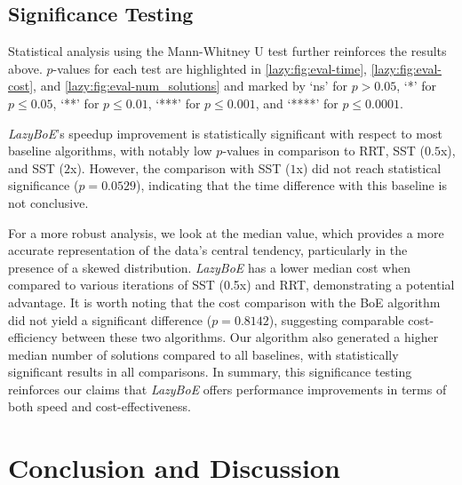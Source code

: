 \subsection{Significance Testing}

Statistical analysis using the Mann-Whitney U test further reinforces the results above.
$p$-values for each test are highlighted in \cref{lazy:fig:eval-time}, \cref{lazy:fig:eval-cost}, and \cref{lazy:fig:eval-num_solutions} and marked by `ns' for $p > 0.05$, `*' for $p \leq 0.05$, `**' for $p \leq 0.01$, `***' for $p \leq 0.001$, and `****' for $p \leq 0.0001$.

\textsl{LazyBoE}'s speedup improvement is statistically significant with respect to most baseline algorithms, with notably low $p$-values in comparison to RRT, SST ($0.5$x), and SST ($2$x). However, the comparison with SST ($1$x) did not reach statistical significance ($p = 0.0529$), indicating that the time difference with this baseline is not conclusive.

For a more robust analysis, we look at the median value, which provides a more accurate representation of the data's central tendency, particularly in the presence of a skewed distribution.
\textsl{LazyBoE} has a lower median cost when compared to various iterations of SST (0.5x) and RRT, demonstrating a potential advantage. It is worth noting that the cost comparison with the BoE algorithm did not yield a significant difference ($p = 0.8142$), suggesting comparable cost-efficiency between these two algorithms.
Our algorithm also generated a higher median number of solutions compared to all baselines, with statistically significant results in all comparisons.
In summary, this significance testing reinforces our claims that \textsl{LazyBoE} offers performance improvements in terms of both speed and cost-effectiveness.

\section{Conclusion and Discussion}
\label{sec:multiquery:opening}

